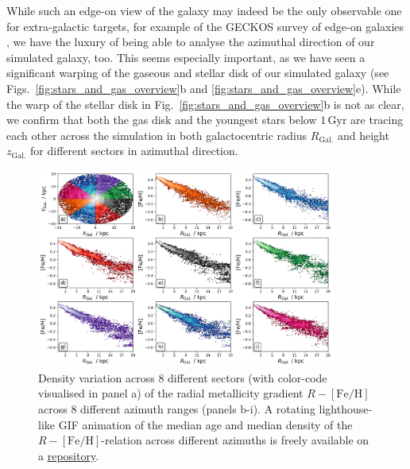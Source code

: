 \documentclass[fleqn,usenatbib]{mnras}
\begin{document}
While such an edge-on view of the galaxy may indeed be the only observable one for extra-galactic targets, for example of the GECKOS survey of edge-on galaxies \citep{GECKOS2023}, we have the luxury of being able to analyse the azimuthal direction of our simulated galaxy, too. This seems especially important, as we have seen a significant warping of the gaseous and stellar disk of our simulated galaxy (see Figs.~\ref{fig:stars_and_gas_overview}b and \ref{fig:stars_and_gas_overview}e). While the warp of the stellar disk in Fig.~\ref{fig:stars_and_gas_overview}b is not as clear, we confirm that both the gas disk and the youngest stars below $1\,\mathrm{Gyr}$ are tracing each other across the simulation in both galactocentric radius $R_\mathrm{Gal.}$ and height $z_\mathrm{Gal.}$ for different sectors in azimuthal direction.

\begin{figure}
    \centering
    \includegraphics[width=0.875\textwidth]{figures/radial_metallicity_gradients_mw_in_angles.png}
    \caption{Density variation across 8 different sectors (with color-code visualised in panel a) of the radial metallicity gradient $R-\mathrm{[Fe/H]}$ across 8 different azimuth ranges (panels b-i). A rotating lighthouse-like GIF animation of the median age and median density of the $R-\mathrm{[Fe/H]}$-relation across different azimuths is freely available on a \href{https://github.com/svenbuder/nihao_radial_metallicity_gradients/blob/main/figures/xyz_rfeh.gif}{repository}.}
    \label{fig:radial_metallicity_gradients_mw_in_angles}
\end{figure}
\end{document}
